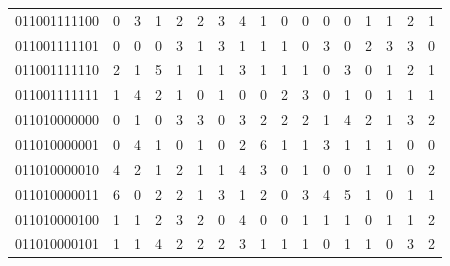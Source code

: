 \documentclass[10pt,a4paper]{article}
\begin{document}
\begin{longtable}{ |c|c|c|c|c|c|c|c|c|c|c|c|c|c|c|c|c| }
    011001111100              & 0                            & 3                                & 1                            & 2                              & 2   & 3   & 4   & 1   & 0   & 0   & 0   & 0   & 1   & 1   & 2   & 1   \\
    011001111101              & 0                            & 0                                & 0                            & 3                              & 1   & 3   & 1   & 1   & 1   & 0   & 3   & 0   & 2   & 3   & 3   & 0   \\
    011001111110              & 2                            & 1                                & 5                            & 1                              & 1   & 1   & 3   & 1   & 1   & 1   & 0   & 3   & 0   & 1   & 2   & 1   \\
    011001111111              & 1                            & 4                                & 2                            & 1                              & 0   & 1   & 0   & 0   & 2   & 3   & 0   & 1   & 0   & 1   & 1   & 1   \\
    011010000000              & 0                            & 1                                & 0                            & 3                              & 3   & 0   & 3   & 2   & 2   & 2   & 1   & 4   & 2   & 1   & 3   & 2   \\
    011010000001              & 0                            & 4                                & 1                            & 0                              & 1   & 0   & 2   & 6   & 1   & 1   & 3   & 1   & 1   & 1   & 0   & 0   \\
    011010000010              & 4                            & 2                                & 1                            & 2                              & 1   & 1   & 4   & 3   & 0   & 1   & 0   & 0   & 1   & 1   & 0   & 2   \\
    011010000011              & 6                            & 0                                & 2                            & 2                              & 1   & 3   & 1   & 2   & 0   & 3   & 4   & 5   & 1   & 0   & 1   & 1   \\
    011010000100              & 1                            & 1                                & 2                            & 3                              & 2   & 0   & 4   & 0   & 0   & 1   & 1   & 1   & 0   & 1   & 1   & 2   \\
    011010000101              & 1                            & 1                                & 4                            & 2                              & 2   & 2   & 3   & 1   & 1   & 1   & 0   & 1   & 1   & 0   & 3   & 2   \\

\end{longtable}
\end{document}
